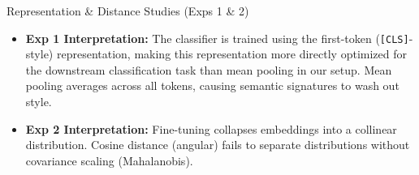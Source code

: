 \documentclass[aspectratio=169]{beamer}
\begin{document}
\begin{frame}{Representation \& Distance Studies (Exps 1 \& 2)}
\centering
{}
\begin{itemize}
    \item \textbf{Exp 1 Interpretation:} The classifier is trained using the first-token (\texttt{[CLS]}-style) representation, making this representation more directly optimized for the downstream classification task than mean pooling in our setup. Mean pooling averages across all tokens, causing semantic signatures to wash out style.
    \item \textbf{Exp 2 Interpretation:} Fine-tuning collapses embeddings into a collinear distribution. Cosine distance (angular) fails to separate distributions without covariance scaling (Mahalanobis).
\end{itemize}
\end{frame}
\end{document}
